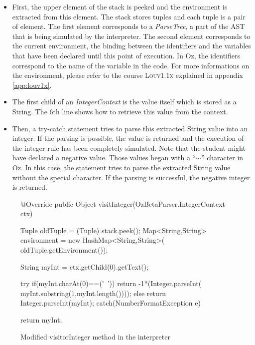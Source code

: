\documentclass[11pt,a4paper,twoside,openright]{report}
\begin{document}
\begin{itemize}
 \item First, the upper element of the stack is peeked and the environment is 
extracted from this element. The stack stores tuples and each tuple is a pair 
of element. The first element corresponds to a \textit{ParseTree}, a part of 
the AST that is being simulated by the interpreter. The second element 
corresponds to the current environment, the binding between the identifiers and 
the variables that have been declared until this point of execution. In Oz, 
the identifiers correspond to the name of the variable in the code. For more 
informations on the environment, please refer to the course \textsc{Louv1.1x} 
explained in appendix \ref{app:louv1x}.
 \item The first child of an \textit{IntegerContext} is the value 
itself which is stored as a String. The 6th line shows how to retrieve this 
value from the context.
 \item Then, a try-catch statement tries to parse this extracted String value 
into an integer. If the parsing is possible, the value is returned and the 
execution of the integer rule has been completely simulated. Note that 
the student might have declared a negative value. Those values 
began with a \enquote{$\sim$} character in Oz. In this case, the
statement tries to parse the extracted String value without the special 
character. If the parsing is successful, the negative integer is 
returned.
\end{itemize}

\begin{figure}[!ht]
  \begin{JAVA}
    @Override public Object visitInteger(OzBetaParser.IntegerContext ctx) {
        Tuple oldTuple = (Tuple) stack.peek();
        Map<String,String> environment = new HashMap<String,String>(
        oldTuple.getEnvironment());

        String myInt = ctx.getChild(0).getText();

        try{
        		if(myInt.charAt(0)==('~')) {
				    return -1*(Integer.parseInt(
				    myInt.substring(1,myInt.length())));
			    }
			else		return   Integer.parseInt(myInt);
        }
        catch(NumberFormatException e) {
        }
        
        return myInt;			
    }
  \end{JAVA}
  \caption{Modified visitorInteger method in the interpreter}
  \label{fig:visit_int}
\end{figure}
\end{document}
